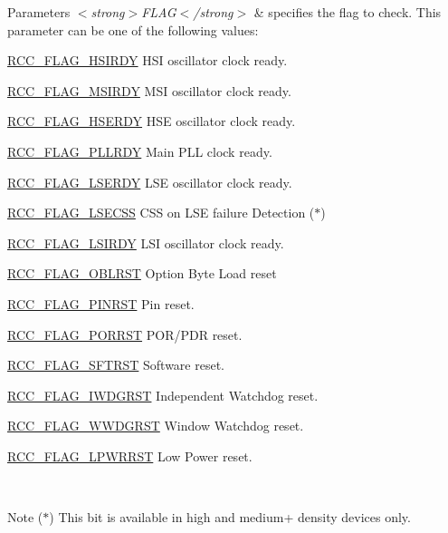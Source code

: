 \begin{DoxyParams}{Parameters}
{\em $<$strong$>$\-F\-L\-A\-G$<$/strong$>$} & specifies the flag to check. This parameter can be one of the following values\-: \begin{DoxyItemize}
\item \hyperlink{group___r_c_c___flag_ga827d986723e7ce652fa733bb8184d216}{R\-C\-C\-\_\-\-F\-L\-A\-G\-\_\-\-H\-S\-I\-R\-D\-Y} H\-S\-I oscillator clock ready. \item \hyperlink{group___r_c_c___flag_ga62ed7a3bb53fc28801071a2ad0d4f1af}{R\-C\-C\-\_\-\-F\-L\-A\-G\-\_\-\-M\-S\-I\-R\-D\-Y} M\-S\-I oscillator clock ready. \item \hyperlink{group___r_c_c___flag_ga173edf47bec93cf269a0e8d0fec9997c}{R\-C\-C\-\_\-\-F\-L\-A\-G\-\_\-\-H\-S\-E\-R\-D\-Y} H\-S\-E oscillator clock ready. \item \hyperlink{group___r_c_c___flag_gaf82d8afb18d9df75db1d6c08b9c50046}{R\-C\-C\-\_\-\-F\-L\-A\-G\-\_\-\-P\-L\-L\-R\-D\-Y} Main P\-L\-L clock ready. \item \hyperlink{group___r_c_c___flag_gac9fb963db446c16e46a18908f7fe1927}{R\-C\-C\-\_\-\-F\-L\-A\-G\-\_\-\-L\-S\-E\-R\-D\-Y} L\-S\-E oscillator clock ready. \item \hyperlink{group___r_c_c___flag_ga7b25cf4df6fbb729b0d3f1530e5f6576}{R\-C\-C\-\_\-\-F\-L\-A\-G\-\_\-\-L\-S\-E\-C\-S\-S} C\-S\-S on L\-S\-E failure Detection ($\ast$) \item \hyperlink{group___r_c_c___flag_ga8c5e4992314d347597621bfe7ab10d72}{R\-C\-C\-\_\-\-F\-L\-A\-G\-\_\-\-L\-S\-I\-R\-D\-Y} L\-S\-I oscillator clock ready. \item \hyperlink{group___r_c_c___flag_ga9bacaedece5c7cb6d9e52c1412e1a8ae}{R\-C\-C\-\_\-\-F\-L\-A\-G\-\_\-\-O\-B\-L\-R\-S\-T} Option Byte Load reset \item \hyperlink{group___r_c_c___flag_gabfc3ab5d4a8a94ec1c9f38794ce37ad6}{R\-C\-C\-\_\-\-F\-L\-A\-G\-\_\-\-P\-I\-N\-R\-S\-T} Pin reset. \item \hyperlink{group___r_c_c___flag_ga39ad309070f416720207eece5da7dc2c}{R\-C\-C\-\_\-\-F\-L\-A\-G\-\_\-\-P\-O\-R\-R\-S\-T} P\-O\-R/\-P\-D\-R reset. \item \hyperlink{group___r_c_c___flag_gaf7852615e9b19f0b2dbc8d08c7594b52}{R\-C\-C\-\_\-\-F\-L\-A\-G\-\_\-\-S\-F\-T\-R\-S\-T} Software reset. \item \hyperlink{group___r_c_c___flag_gaac46bac8a97cf16635ff7ffc1e6c657f}{R\-C\-C\-\_\-\-F\-L\-A\-G\-\_\-\-I\-W\-D\-G\-R\-S\-T} Independent Watchdog reset. \item \hyperlink{group___r_c_c___flag_gaa80b60b2d497ccd7b7de1075009999a7}{R\-C\-C\-\_\-\-F\-L\-A\-G\-\_\-\-W\-W\-D\-G\-R\-S\-T} Window Watchdog reset. \item \hyperlink{group___r_c_c___flag_ga67049531354aed7546971163d02c9920}{R\-C\-C\-\_\-\-F\-L\-A\-G\-\_\-\-L\-P\-W\-R\-R\-S\-T} Low Power reset. \end{DoxyItemize}
\\
\hline
\end{DoxyParams}
\begin{DoxyNote}{Note}
($\ast$) This bit is available in high and medium+ density devices only. 
\end{DoxyNote}

